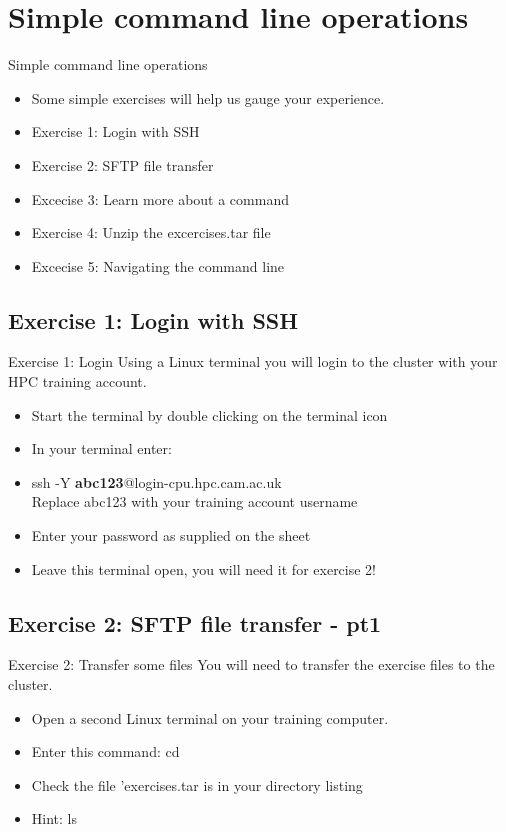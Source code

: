 \section{Simple command line operations}
\begin{frame}{Simple command line operations}
\begin{itemize}
\item{Some simple exercises will help us gauge your experience.}
\item{Exercise 1: Login with SSH}
\item{Exercise 2: SFTP file transfer}
\item{Excecise 3: Learn more about a command}
\item{Exercise 4: Unzip the excercises.tar file}
\item{Excecise 5: Navigating the command line}
\end{itemize}
\end{frame}

\subsection{Exercise 1: Login with SSH}
\begin{frame}{Exercise 1: Login}
Using a Linux terminal you will login to the cluster with your HPC training account.
\begin{itemize}
\item{Start the terminal by double clicking on the terminal icon}
\item In your terminal enter:
\item{ssh -Y \textbf{abc123}@login-cpu.hpc.cam.ac.uk}\\
Replace abc123 with your training account username 
\item {Enter your password as supplied on the sheet}
\item{Leave this terminal open, you will need it for exercise 2!}
\end{itemize}
\end{frame}

\subsection{Exercise 2: SFTP file transfer - pt1}
\begin{frame}{Exercise 2: Transfer some files}
You will need to transfer the exercise files to the cluster.
\begin{itemize}
\item{Open a second Linux terminal on your training computer.}
\item{Enter this command: cd \alert{\footnotesize {}}}
\item{Check the file 'exercises.tar is in your directory listing}
\item{Hint: ls}
\end{itemize}
\end{frame}

